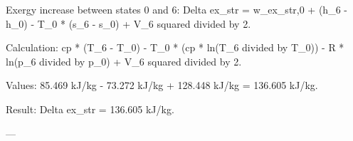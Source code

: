 Exergy increase between states 0 and 6:  
Delta ex_str = w_ex_str,0 + (h_6 - h_0) - T_0 * (s_6 - s_0) + V_6 squared divided by 2.  

Calculation:  
cp * (T_6 - T_0) - T_0 * (cp * ln(T_6 divided by T_0)) - R * ln(p_6 divided by p_0) + V_6 squared divided by 2.  

Values:  
85.469 kJ/kg - 73.272 kJ/kg + 128.448 kJ/kg = 136.605 kJ/kg.  

Result:  
Delta ex_str = 136.605 kJ/kg.  

---